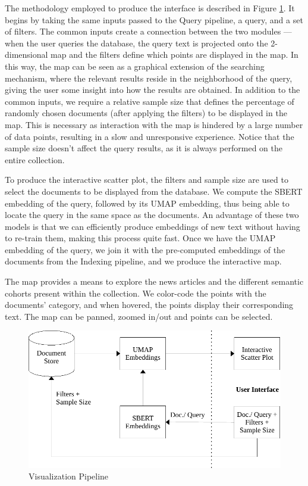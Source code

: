 \documentclass[a4paper]{article}
\begin{document}
The methodology employed to produce the interface is described in Figure \ref{vis_pipeline}. It begins by taking the same inputs passed to the Query pipeline, a query, and a set of filters. The common inputs create a connection between the two modules — when the user queries the database, the query text is projected onto the 2-dimensional map and the filters define which points are displayed in the map. In this way, the map can be seen as a graphical extension of the searching mechanism, where the relevant results reside in the neighborhood of the query, giving the user some insight into how the results are obtained. In addition to the common inputs, we require a relative sample size that defines the percentage of randomly chosen documents (after applying the filters) to be displayed in the map. This is necessary as interaction with the map is hindered by a large number of data points, resulting in a slow and unresponsive experience. Notice that the sample size doesn't affect the query results, as it is always performed on the entire collection.

To produce the interactive scatter plot, the filters and sample size are used to select the documents to be displayed from the database. We compute the SBERT embedding of the query, followed by its UMAP embedding, thus being able to locate the query in the same space as the documents. An advantage of these two models is that we can efficiently produce embeddings of new text without having to re-train them, making this process quite fast. Once we have the UMAP embedding of the query, we join it with the pre-computed embeddings of the documents from the Indexing pipeline, and we produce the interactive map.

The map provides a means to explore the news articles and the different semantic cohorts present within the collection. We color-code the points with the documents' category, and when hovered, the points display their corresponding text. The map can be panned, zoomed in/out and points can be selected.

\begin{figure}[H]
	\centering
	\includegraphics[scale=0.7]{./figures/vis_pipeline}
	\caption{Visualization Pipeline}
	\label{vis_pipeline}
\end{figure}
\end{document}
